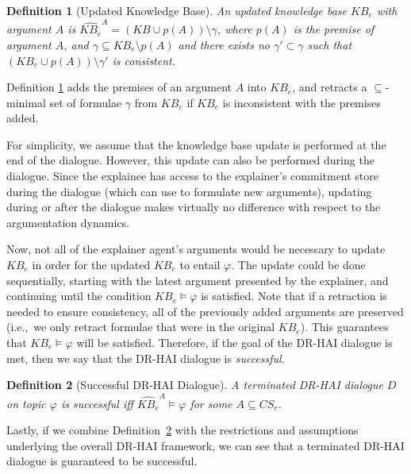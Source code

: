\documentclass[letterpaper]{article} %
\newtheorem{definition}{{\bf Definition}}
\begin{document}
\begin{definition}[Updated Knowledge Base]
    An \emph{updated knowledge base} $KB_e$ with argument $A$ is $\widehat{KB_e}^{A} = (KB \cup p(A))\setminus \gamma$, where $p(A)$ is the premise of argument $A$, and $\gamma \subseteq KB_e \setminus p(A)$ and there exists no $\gamma' \subset \gamma$ such that $(KB_e \cup p(A))\setminus \gamma'$ is consistent.
    \label{def:kb_update}
\end{definition}


Definition \ref{def:kb_update} adds the premises of an argument $A$ into $KB_e$, and retracts a $\subseteq$-minimal set of formulae $\gamma$ from $KB_e$ if $KB_e$ is inconsistent with the premises added. 


For simplicity, we assume that the knowledge base update is performed at the end of the dialogue. However, this update can also be performed during the dialogue. Since the explainee has access to the explainer's commitment store during the dialogue (which can use to formulate new arguments), updating during or after the dialogue makes virtually no difference with respect to the argumentation dynamics.  

Now, not all of the explainer agent's arguments would be necessary to update $KB_e$ in order for the updated $KB_e$ to entail $\varphi$. The update could be done sequentially, starting with the latest argument presented by the explainer, and continuing until the condition $KB_e \models \varphi$ is satisfied. Note that if a retraction is needed to ensure consistency, all of the previously added arguments are preserved (i.e.,~we only retract formulae that were in the original $KB_e$). This guarantees that $KB_e \models \varphi$ will be satisfied. Therefore, if the goal of the DR-HAI dialogue is met, then we say that the DR-HAI dialogue is \emph{successful}. 


\begin{definition}[Successful DR-HAI Dialogue]
    A terminated DR-HAI dialogue $D$ on topic $\varphi$ is \emph{successful} iff $\widehat{KB_e}^{A} \models \varphi$ for some $A \subseteq CS_r$.
    \label{def:succ}
\end{definition}


Lastly, if we combine Definition~\ref{def:succ} with the restrictions and assumptions underlying the overall DR-HAI framework, we can see that a terminated DR-HAI dialogue is guaranteed to be successful.
\end{document}
